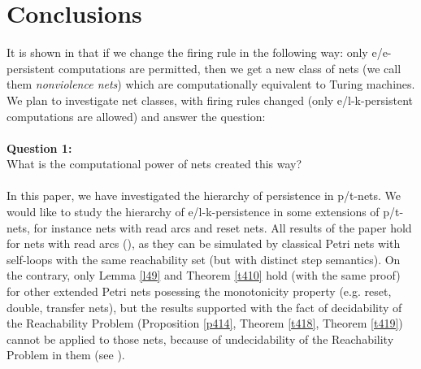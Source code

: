 \documentclass[a4paper]{llncs}
\begin{document}
\section{Conclusions}

It is shown in \cite{BarMikOch} that if we change the firing rule in the following way: only e/e-persistent computations are permitted, then we get a new class of nets (we call them \emph{nonviolence nets}) which are computationally equivalent to Turing machines.
We plan to investigate net classes, with firing rules changed (only e/l-k-persistent computations are allowed) and answer the question:
\\ \\
\textbf{Question 1:}\\
What is the computational power of nets created this way?
\\ \\
In this paper, we have investigated the hierarchy of persistence in p/t-nets. We would like to study the hierarchy of e/l-k-persistence in some extensions of p/t-nets, for instance nets with read arcs and reset nets. 
All results of the paper hold for nets with read arcs (\cite{MontanariRossi}), as they can be simulated by classical Petri nets with self-loops with the same reachability set (but with distinct step semantics).
On the contrary, only Lemma \ref{l49} and Theorem \ref{t410} hold (with the same proof) for other extended Petri nets posessing the monotonicity property (e.g. reset, double, transfer nets), but the results supported with the fact of decidability of the Reachability Problem (Proposition \ref{p414}, Theorem \ref{t418}, Theorem \ref{t419}) cannot be applied to those nets, because of undecidability of the Reachability Problem in them (see \cite{Dufourd}).


{}

\end{document}
